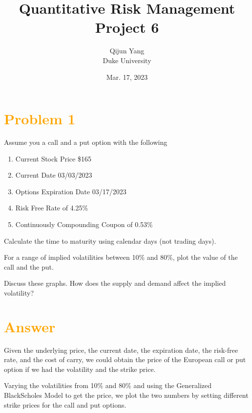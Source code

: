\documentclass[11pt,en]{elegantpaper}
\title{Quantitative Risk Management Project 6}
\author{Qijun Yang \\ Duke University}
\institute{\href{https://fintech.meng.duke.edu}{Financial Technology at Duke University}}
\date{Mar. 17, 2023}
\begin{document}
\maketitle

\section*{\textcolor{orange}{Problem 1}}

Assume you a call and a put option with the following
\begin{enumerate}
    \item Current Stock Price \$165
    \item Current Date 03/03/2023
    \item Options Expiration Date 03/17/2023
    \item Risk Free Rate of 4.25\%
    \item Continuously Compounding Coupon of 0.53\%
\end{enumerate}

Calculate the time to maturity using calendar days (not trading days).

For a range of implied volatilities between 10\% and 80\%, plot the value of the call and the put.

Discuss these graphs. How does the supply and demand affect the implied volatility?

\section*{\textcolor{orange}{Answer}}
Given the underlying price, the current date, the expiration date, the risk-free rate, and the cost of carry, we could obtain the price of the European call or put option if we had the volatility and the strike price.

Varying the volatilities from 10\% and 80\% and using the Generalized Black\-Scholes Model to get the price, we plot the two numbers by setting different strike prices for the call and put options.
\end{document}
